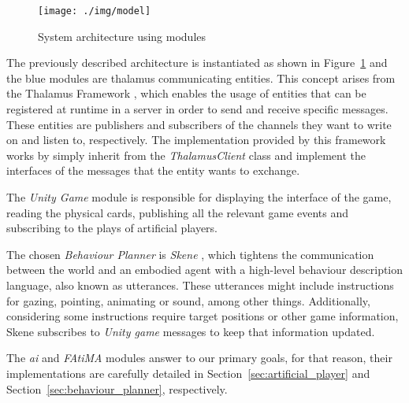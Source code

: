 \begin{figure}[ht]
  \centering
    \texttt{[image: ./img/model]}
  \caption{System architecture using modules}
\label{fig:model}
\end{figure}

The previously described architecture is instantiated as shown in Figure~\ref{fig:model} and the blue modules are thalamus communicating entities.
This concept arises from the Thalamus Framework \cite{Ribeiro}, which enables the usage of entities that can be registered at runtime in a server in order to send and receive specific messages.
These entities are publishers and subscribers of the channels they want to write on and listen to, respectively.
The implementation provided by this framework works by simply inherit from the \emph{ThalamusClient} class and implement the interfaces of the messages that the entity wants to exchange.

The \emph{Unity Game} module is responsible for displaying the interface of the game, reading the physical cards, publishing all the relevant game events and subscribing to the plays of artificial players.

The chosen \emph{Behaviour Planner} is \emph{Skene} \cite{Ribeiroa}, which tightens the communication between the world and an embodied agent with a high-level behaviour description language, also known as utterances.
These utterances might include instructions for gazing, pointing, animating or sound, among other things.
Additionally, considering some instructions require target positions or other game information, Skene subscribes to \emph{Unity game} messages to keep that information updated.

The \emph{\ac{ai}} and \emph{FAtiMA} modules answer to our primary goals, for that reason, their implementations are carefully detailed in Section~\ref{sec:artificial_player} and Section~\ref{sec:behaviour_planner}, respectively.
